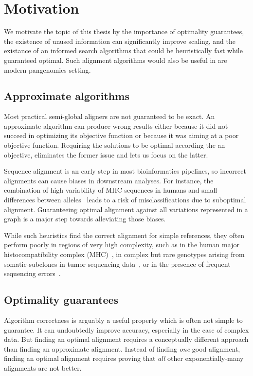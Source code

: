 \section*{Motivation}

We motivate the topic of this thesis by the importance of optimality guarantees,
the existence of unused information can significantly improve scaling, and the
existance of an informed search algorithms that could be heuristically fast
while guaranteed optimal. Such alignment algorithms would also be useful in are
modern pangenomics setting.

\subsection*{Approximate algorithms}

Most practical semi-global aligners are not guaranteed to be exact. An
approximate algorithm can produce wrong results either because it did not
succeed in optimizing its objective function or because it was aiming at a poor
objective function. Requiring the solutions to be optimal according the an
objective, eliminates the former issue and lets us focus on the latter.

Sequence alignment is an early step in most bioinformatics pipelines, so
incorrect alignments can cause biases in downstream analyses. For instance, the
combination of high variability of MHC sequences in humans and small differences
between alleles~\cite{buhler_hla_2011} leads to a risk of misclassifications due
to suboptimal alignment. Guaranteeing optimal alignment against all variations
represented in a graph is a major step towards alleviating those biases.

While such heuristics find the correct alignment for simple references, they
often perform poorly in regions of very high complexity, such as in the human
major histocompatibility complex (MHC)~\cite{dilthey_improved_2015}, in complex
but rare genotypes arising from somatic-subclones in tumor sequencing
data~\cite{harismendy_detection_2011}, or in the presence of frequent sequencing
errors~\cite{salmela_lordec_2014}.

\subsection*{Optimality guarantees}

Algorithm correctness is arguably a useful property which is often not simple to
guarantee. It can undoubtedly improve accuracy, especially in the case of
complex data. But finding an optimal alignment requires a conceptually different
approach than finding an approximate alignment. Instead of finding \emph{one}
good alignment, finding an optimal alignment requires proving that \emph{all}
other exponentially-many alignments are not better.

